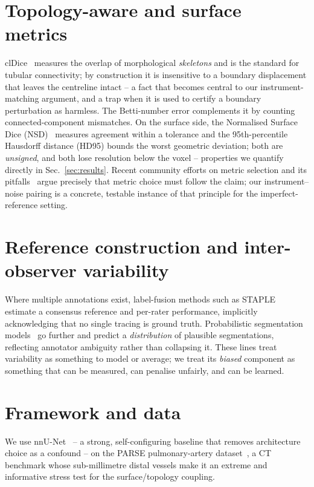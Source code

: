 \documentclass[
    bookmarks, bookmarksnumbered, bookmarksopen,
    colorlinks=true, citecolor=blue, linkcolor=blue, urlcolor=blue
]{techrep}
\begin{document}
\section{Topology-aware and surface metrics}
clDice~\cite{shit2021cldice} measures the overlap of morphological \emph{skeletons} and is
the standard for tubular connectivity; by construction it is insensitive to a boundary
displacement that leaves the centreline intact -- a fact that becomes central to our
instrument-matching argument, and a trap when it is used to certify a boundary perturbation
as harmless. The Betti-number error complements it by counting connected-component
mismatches. On the surface side, the Normalised Surface Dice (NSD)~\cite{nikolov2018nsd}
measures agreement within a tolerance and the 95th-percentile Hausdorff distance (HD95)
bounds the worst geometric deviation; both are \emph{unsigned}, and both lose resolution
below the voxel -- properties we quantify directly in Sec.~\ref{sec:results}. Recent
community efforts on metric selection and its pitfalls~\cite{maierhein2024metrics} argue
precisely that metric choice must follow the claim; our instrument--noise pairing is a
concrete, testable instance of that principle for the imperfect-reference setting.

\section{Reference construction and inter-observer variability}
Where multiple annotations exist, label-fusion methods such as
STAPLE~\cite{warfield2004staple} estimate a consensus reference and per-rater performance,
implicitly acknowledging that no single tracing is ground truth. Probabilistic segmentation
models~\cite{kohl2018probunet} go further and predict a \emph{distribution} of plausible
segmentations, reflecting annotator ambiguity rather than collapsing it. These lines treat
variability as something to model or average; we treat its \emph{biased} component as
something that can be measured, can penalise unfairly, and can be learned.

\section{Framework and data}
We use nnU-Net~\cite{isensee2021nnunet} -- a strong, self-configuring baseline that removes
architecture choice as a confound -- on the PARSE pulmonary-artery
dataset~\cite{parse2022}, a CT benchmark whose sub-millimetre distal vessels make it an
extreme and informative stress test for the surface/topology coupling.
\end{document}
